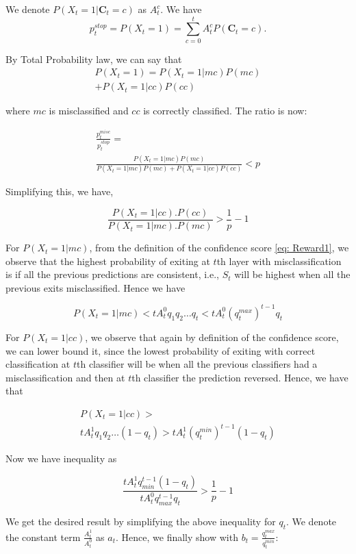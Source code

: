 We denote $P(X_t = 1|\mathbf{C}_t = c)$ as $A_{t}^{c}$. We have 
$$p_t^{stop} = P(X_t=1)= \sum_{c = 0}^{t}A_t^{c}P(\mathbf{C}_t=c).$$

By Total Probability law, we can say that
\begin{multline}
P(X_t= 1) = P(X_t = 1|mc)P(mc)\\+P(X_t = 1|cc)P(cc)
\end{multline}

where $mc$ is misclassified and $cc$ is correctly classified. The ratio is now:

\begin{multline}
    \frac{p_t^{misc}}{p_t^{stop}} =\\ \frac{P(X_t=1|mc)P(mc)}{P(X_t=1|mc)P(mc)+P(X_t  = 1|cc)P(cc)}<p
\end{multline}

Simplifying this, we have,

$$\frac{P(X_t = 1|cc).P(cc)}{P(X_t = 1|mc).P(mc)}>\frac{1}{p}-1$$

For $P(X_t = 1|mc)$, from the definition of the confidence score \ref{eq: Reward1}, we observe that the highest probability of exiting at $t$th layer with misclassification is if all the previous predictions are consistent, i.e.,  $S_t$ will be highest when all the previous exits misclassified. Hence we have 

$$P(X_t = 1|mc)< tA_t^{0}q_1q_2\ldots q_t<tA_t^{0}(q_t^{max})^{t-1}q_t$$

For $P(X_t = 1|cc)$, we observe that again by definition of the confidence score, we can lower bound it, since the lowest probability of exiting with correct classification at $t$th classifier will be when all the previous classifiers had a misclassification and then at $t$th classifier the prediction reversed. Hence, we have that

\begin{multline}
P(X_t = 1|cc)>\\ tA_t^{1}q_1q_2\ldots (1-q_t)>tA_t^{1}(q_t^{min})^{t-1}(1-q_t)
\end{multline}

Now we have inequality as 

$$\frac{tA_t^{1}q_{min}^{t-1}(1-q_t)}{tA_t^{0}q_{max}^{t-1}q_t}>\frac{1}{p}-1$$

We get the desired result by simplifying the above inequality for $q_t$. We denote the constant term $\frac{A_t^1}{A_t^{0}}$ as $a_t$. Hence, we finally show with $b_t = \frac{q_t^{max}}{q_t^{min}}$:


